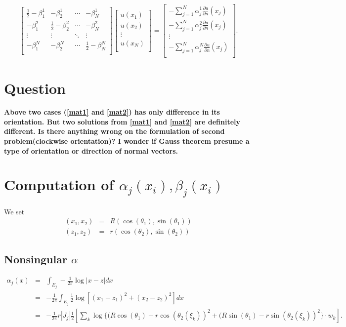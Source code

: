 \begin{eqnarray}
\label{mat2}
\begin{bmatrix}
    \frac{1}{2}-\beta^1_1& -\beta^1_2& \cdots & -\beta^1_N \\
    -\beta^2_1& \frac{1}{2}-\beta^2_2& \cdots & -\beta^2_N\\
    \vdots& \vdots& \ddots& \vdots\\
    -\beta^N_1& -\beta^N_2& \cdots & \frac{1}{2} - \beta^N_N \\
\end{bmatrix}
\begin{bmatrix}
    u(x_1)    \\
    u(x_2)    \\
    \vdots      \\
    u(x_N)    \\
\end{bmatrix}
=
\begin{bmatrix}
    - \sum_{j=1}^N \alpha^1_j\frac{\partial u}{\partial n}(x_j)   \\
    - \sum_{j=1}^N \alpha^2_j\frac{\partial u}{\partial n}(x_j)   \\
    \vdots  \\
    - \sum_{j=1}^N \alpha^N_j\frac{\partial u}{\partial n}(x_j)   \\
\end{bmatrix}.
\end{eqnarray}

\section{Question}
{\bf Above two cases (\ref{mat1} and \ref{mat2}) has only
difference in its orientation. But two solutions from \ref{mat1}
and \ref{mat2} are definitely different. Is there anything wrong
on the formulation of second problem(clockwise orientation)? I
wonder if Gauss theorem presume a type of orientation or direction
of normal vectors.}

\section{Computation of $\alpha_j(x_i), \beta_j(x_i)$}
We set
\begin{eqnarray}
(x_1, x_2) &=& R (\cos(\theta_1), \sin(\theta_1))\\
(z_1, z_2) &=& r (\cos(\theta_2), \sin(\theta_2))
\end{eqnarray}

\subsection{Nonsingular $\alpha$}
\begin{eqnarray}
\alpha_j(x) &=& \int_{E_j} - \frac{1}{2\pi} \log | x-z | dx \\
&=&- \frac{1}{2\pi} \int_{E_j} \frac{1}{2} \log\left[(x_1-z_1)^2 + (x_2-z_2)^2 \right] dx \\
&=&- \frac{1}{2\pi} r |J_j| \frac{1}{2} \left[ \sum_{k} \log \{(R \cos(\theta_1)-r\cos(\theta_2(\xi_k))^2 + (R\sin(\theta_1)-r\sin(\theta_2(\xi_k))^2 \} \cdot w_k \right].
\end{eqnarray}


